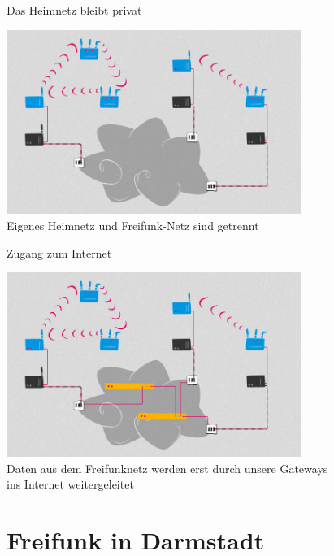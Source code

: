 \documentclass[10pt]{beamer}
\begin{document}
\begin{frame}{Das Heimnetz bleibt privat}
	\begin{center}
		\includegraphics[height=6cm]{images/network_4} \\
		\vfill
		Eigenes Heimnetz und Freifunk-Netz sind getrennt
	\end{center}
	
\end{frame}


\begin{frame}{Zugang zum Internet}
	\begin{center}
		\includegraphics[height=6cm]{images/network_5} \\
		\vfill
		Daten aus dem Freifunknetz werden erst durch unsere Gateways\\ ins Internet weitergeleitet
	\end{center}
\end{frame}


\section{Freifunk in Darmstadt}
\end{document}
